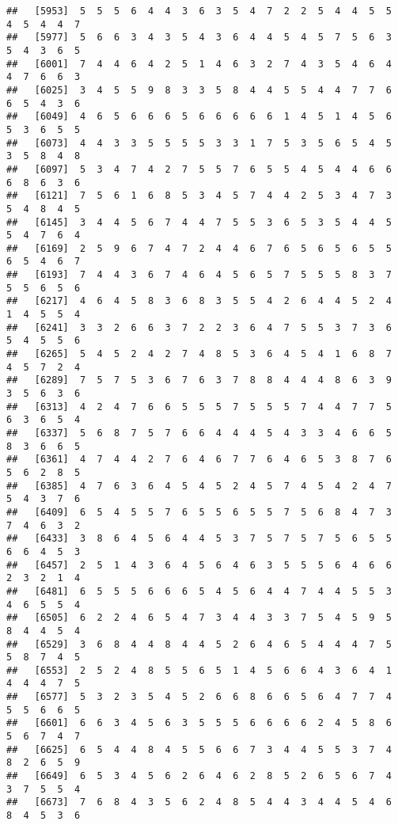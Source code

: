 \documentclass[
]{book}
\begin{document}
\begin{verbatim}
##   [5953]  5  5  5  6  4  4  3  6  3  5  4  7  2  2  5  4  4  5  5  4  5  4  4  7
##   [5977]  5  6  6  3  4  3  5  4  3  6  4  4  5  4  5  7  5  6  3  5  4  3  6  5
##   [6001]  7  4  4  6  4  2  5  1  4  6  3  2  7  4  3  5  4  6  4  4  7  6  6  3
##   [6025]  3  4  5  5  9  8  3  3  5  8  4  4  5  5  4  4  7  7  6  6  5  4  3  6
##   [6049]  4  6  5  6  6  6  5  6  6  6  6  6  1  4  5  1  4  5  6  5  3  6  5  5
##   [6073]  4  4  3  3  5  5  5  5  3  3  1  7  5  3  5  6  5  4  5  3  5  8  4  8
##   [6097]  5  3  4  7  4  2  7  5  5  7  6  5  5  4  5  4  4  6  6  6  8  6  3  6
##   [6121]  7  5  6  1  6  8  5  3  4  5  7  4  4  2  5  3  4  7  3  5  4  8  4  5
##   [6145]  3  4  4  5  6  7  4  4  7  5  5  3  6  5  3  5  4  4  5  5  4  7  6  4
##   [6169]  2  5  9  6  7  4  7  2  4  4  6  7  6  5  6  5  6  5  5  6  5  4  6  7
##   [6193]  7  4  4  3  6  7  4  6  4  5  6  5  7  5  5  5  8  3  7  5  5  6  5  6
##   [6217]  4  6  4  5  8  3  6  8  3  5  5  4  2  6  4  4  5  2  4  1  4  5  5  4
##   [6241]  3  3  2  6  6  3  7  2  2  3  6  4  7  5  5  3  7  3  6  5  4  5  5  6
##   [6265]  5  4  5  2  4  2  7  4  8  5  3  6  4  5  4  1  6  8  7  4  5  7  2  4
##   [6289]  7  5  7  5  3  6  7  6  3  7  8  8  4  4  4  8  6  3  9  3  5  6  3  6
##   [6313]  4  2  4  7  6  6  5  5  5  7  5  5  5  7  4  4  7  7  5  6  3  6  5  4
##   [6337]  5  6  8  7  5  7  6  6  4  4  4  5  4  3  3  4  6  6  5  8  3  6  6  5
##   [6361]  4  7  4  4  2  7  6  4  6  7  7  6  4  6  5  3  8  7  6  5  6  2  8  5
##   [6385]  4  7  6  3  6  4  5  4  5  2  4  5  7  4  5  4  2  4  7  5  4  3  7  6
##   [6409]  6  5  4  5  5  7  6  5  5  6  5  5  7  5  6  8  4  7  3  7  4  6  3  2
##   [6433]  3  8  6  4  5  6  4  4  5  3  7  5  7  5  7  5  6  5  5  6  6  4  5  3
##   [6457]  2  5  1  4  3  6  4  5  6  4  6  3  5  5  5  6  4  6  6  2  3  2  1  4
##   [6481]  6  5  5  5  6  6  6  5  4  5  6  4  4  7  4  4  5  5  3  4  6  5  5  4
##   [6505]  6  2  2  4  6  5  4  7  3  4  4  3  3  7  5  4  5  9  5  8  4  4  5  4
##   [6529]  3  6  8  4  4  8  4  4  5  2  6  4  6  5  4  4  4  7  5  5  8  7  4  5
##   [6553]  2  5  2  4  8  5  5  6  5  1  4  5  6  6  4  3  6  4  1  4  4  4  7  5
##   [6577]  5  3  2  3  5  4  5  2  6  6  8  6  6  5  6  4  7  7  4  5  5  6  6  5
##   [6601]  6  6  3  4  5  6  3  5  5  5  6  6  6  6  2  4  5  8  6  5  6  7  4  7
##   [6625]  6  5  4  4  8  4  5  5  6  6  7  3  4  4  5  5  3  7  4  8  2  6  5  9
##   [6649]  6  5  3  4  5  6  2  6  4  6  2  8  5  2  6  5  6  7  4  3  7  5  5  4
##   [6673]  7  6  8  4  3  5  6  2  4  8  5  4  4  3  4  4  5  4  6  8  4  5  3  6

\end{verbatim}
\end{document}
